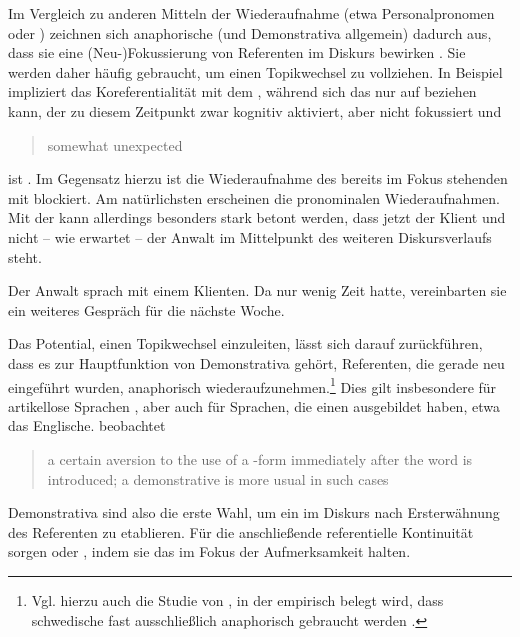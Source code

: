 Im Vergleich zu anderen Mitteln der Wiederaufnahme   (etwa Personalpronomen oder ) zeichnen sich anaphorische   (und Demonstrativa  allgemein) dadurch aus, dass sie eine (Neu-)Fokussierung von Referenten im Diskurs bewirken \parencite [s. u.a.][]{Ehlich1979,Prince1981,Gundel1993,Comrie1997,Himmelmann1996,Diessel1999,Kibrik2011}. Sie werden daher häufig gebraucht, um einen Topikwechsel   zu vollziehen. In Beispiel  \parencite[angelehnt an][96]{Diessel1999} impliziert das   Koreferentialität  mit dem  , während sich das   nur auf  beziehen kann, der zu diesem Zeitpunkt zwar kognitiv aktiviert, aber nicht fokussiert und \blockcquote[96]{Diessel1999}{somewhat unexpected} ist \parencite[vgl. hierzu][278--279]{Gundel1993}. Im Gegensatz hierzu ist die Wiederaufnahme des bereits im Fokus stehenden  mit  blockiert. Am natürlichsten erscheinen die pronominalen  Wiederaufnahmen. Mit der   kann allerdings besonders stark betont werden, dass jetzt der Klient und nicht -- wie erwartet -- der Anwalt im Mittelpunkt des weiteren Diskursverlaufs steht.   

\begin{exe}
	\ex \label{ex:topic} Der Anwalt sprach mit einem Klienten. Da  nur wenig Zeit hatte, vereinbarten sie ein weiteres Gespräch für die nächste Woche. 
\end{exe}

Das Potential, einen Topikwechsel  einzuleiten, lässt sich darauf zurückführen, dass es zur Hauptfunktion von Demonstrativa  gehört, Referenten, die gerade neu eingeführt wurden, anaphorisch  wiederaufzunehmen.\footnote{Vgl. hierzu auch die Studie von \citeauthor{Fraurud1990}, in der empirisch belegt wird, dass schwedische  fast ausschließlich anaphorisch  gebraucht werden \parencite[400]{Fraurud1990}.} Dies gilt insbesondere für artikellose Sprachen  \parencite[229]{Himmelmann1996}, aber auch für Sprachen, die einen  ausgebildet haben, etwa das Englische. \citeauthor{Christophersen1939} beobachtet \blockcquote[vgl.][29]{Christophersen1939} {a certain aversion to the use of a -form immediately after the word is introduced; a demonstrative is more usual in such cases}. Demonstrativa  sind also die erste Wahl, um ein  im Diskurs nach Ersterwähnung des Referenten zu etablieren. Für die  anschließende referentielle Kontinuität  sorgen  oder , indem sie das  im Fokus der Aufmerksamkeit halten.\largerpage[-3]

